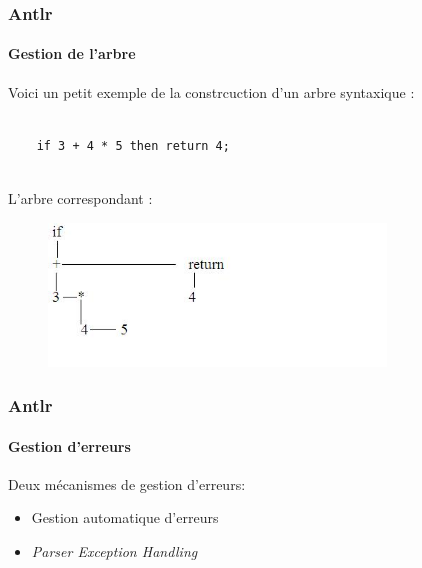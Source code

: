 \documentclass{beamer}
\begin{document}
\begin{frame}[fragile,allowframebreaks=0.98]
\frametitle{Antlr}\framesubtitle{Gestion de l'arbre}
	Voici un petit exemple de la constrcuction d'un arbre syntaxique : 
\begin{Verbatim}[fontsize=\scriptsize,frame=lines]
	
	if 3 + 4 * 5 then return 4;
	
\end{Verbatim}

L'arbre correspondant :

\begin{figure}[h]
	\centering
		\includegraphics[width=0.80\textwidth]{ast.jpg}
	\label{fig:ast_process}
\end{figure}
	
\end{frame}

\begin{frame}\frametitle{Antlr}\framesubtitle{Gestion d'erreurs}
	Deux mécanismes de gestion d'erreurs:
	 \begin{itemize}
			\item Gestion automatique d'erreurs
			\item \textit{Parser Exception Handling}
		\end{itemize}

\end{frame}
\end{document}
